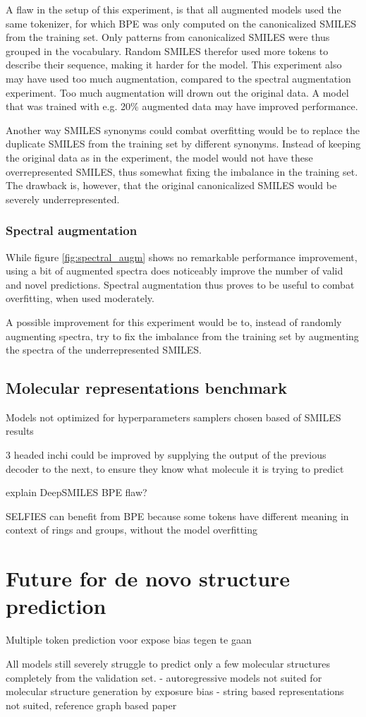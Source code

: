 A flaw in the setup of this experiment, is that all augmented models used the same tokenizer, for which \ac{BPE} was only computed on the canonicalized SMILES from the training set.
Only patterns from canonicalized SMILES were thus grouped in the vocabulary.
Random SMILES therefor used more tokens to describe their sequence, making it harder for the model.
This experiment also may have used too much augmentation, compared to the spectral augmentation experiment.
Too much augmentation will drown out the original data.
A model that was trained with e.g. 20\% augmented data may have improved performance.

Another way SMILES synonyms could combat overfitting would be to replace the duplicate SMILES from the training set by different synonyms.
Instead of keeping the original data as in the experiment, the model would not have these overrepresented SMILES, thus somewhat fixing the imbalance in the training set.
The drawback is, however, that the original canonicalized SMILES would be severely underrepresented.

\subsubsection*{Spectral augmentation}

While figure \ref{fig:spectral_augm} shows no remarkable performance improvement, using a bit of augmented spectra does noticeably improve the number of valid and novel predictions.
Spectral augmentation thus proves to be useful to combat overfitting, when used moderately.

A possible improvement for this experiment would be to, instead of randomly augmenting spectra, try to fix the imbalance from the training set by augmenting the spectra of the underrepresented SMILES.

\subsection{Molecular representations benchmark}

Models not optimized for hyperparameters
samplers chosen based of SMILES results

3 headed inchi could be improved by supplying the output of the previous decoder to the next, to ensure they know what molecule it is trying to predict

explain DeepSMILES BPE flaw?

SELFIES can benefit from BPE because some tokens have different meaning in context of rings and groups, without the model overfitting

\section{Future for de novo structure prediction}

Multiple token prediction voor expose bias tegen te gaan

All models still severely struggle to predict only a few molecular structures completely from the validation set.
- autoregressive models not suited for molecular structure generation by exposure bias
- string based representations not suited, reference graph based paper
